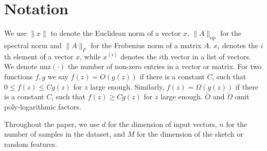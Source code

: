 \section{Notation}\label{apdx:notation}

We use $\|x\|$ to denote the Euclidean norm of a vector $x$, $\|A\|_\text{op}$ for the spectral norm and $\|A\|_F$ for the Frobenius norm of a matrix $A$.
$x_i$ denotes the $i$th element of a vector $x$, while $x^{(i)}$ denotes the $i$th vector in a list of vectors.
We denote $\text{nnz}(\cdot)$ the number of non-zero entries in a vector or matrix. For two functions $f, g$ we say $f(z) = O(g(z))$ if there is a constant $C$, such that $0 \le f(z) \le C g(z)$ for $z$ large enough. Similarly, $f(z) = \Omega(g(z))$ if there is a constant $C$, such that $f(z) \ge C g(z)$ for $z$ large enough. $\tilde O$ and $\tilde \Omega$ omit poly-logarithmic factors. 

Throughout the paper, we use $d$ for the dimension of input vectors, $n$ for the number of samples in the dataset, and $M$ for the dimension of the sketch or random features.  